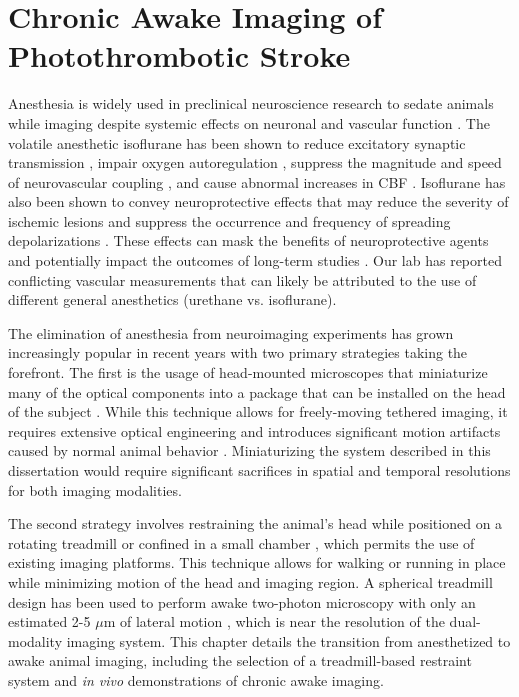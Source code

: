 
\chapter{Chronic Awake Imaging of Photothrombotic Stroke} \label{ch:awake}

Anesthesia is widely used in preclinical neuroscience research to sedate animals while imaging despite systemic effects on neuronal and vascular function \cite{Janssen:2004ih}. The volatile anesthetic isoflurane has been shown to reduce excitatory synaptic transmission \cite{BergJohnsen:1992wk}, impair oxygen autoregulation \cite{Aksenov:2012wh}, suppress the magnitude and speed of neurovascular coupling \cite{Pisauro:2013cx}, and cause abnormal increases in CBF \cite{Strebel:1995uh, Iida:1998th}. Isoflurane has also been shown to convey neuroprotective effects that may reduce the severity of ischemic lesions \cite{Sakai:2007wc, Burchell:2013tj} and suppress the occurrence and frequency of spreading depolarizations \cite{Kudo:2016ho}. These effects can mask the benefits of neuroprotective agents and potentially impact the outcomes of long-term studies \cite{Kapinya:ua, Seto:2014ga}. Our lab has reported \cite{Ponticorvo:2010uv, Kazmi:2013ey, Sullender:2018ff} conflicting vascular  measurements that can likely be attributed to the use of different general anesthetics (urethane vs. isoflurane).

The elimination of anesthesia from neuroimaging experiments has grown increasingly popular in recent years with two primary strategies taking the forefront. The first is the usage of head-mounted microscopes that miniaturize many of the optical components into a package that can be installed on the head of the subject \cite{Gu:1999ky, Helmchen:2001tw, Flusberg:2005tq}. While this technique allows for freely-moving tethered imaging, it requires extensive optical engineering and introduces significant motion artifacts caused by normal animal behavior \cite{Helmchen:2001tw}. Miniaturizing the system described in this dissertation would require significant sacrifices in spatial and temporal resolutions for both imaging modalities.

The second strategy involves restraining the animal's head while positioned on a rotating treadmill \cite{Pisauro:2013cx, Dombeck:2007gr, Wienisch:2011ju, Kaifosh:2013fy, Heiney:2018gq} or confined in a small chamber \cite{Silasi:2016dq}, which permits the use of existing imaging platforms. This technique allows for walking or running in place while minimizing motion of the head and imaging region. A spherical treadmill design has been used to perform awake two-photon microscopy with only an estimated 2-5 $\mu$m of lateral motion \cite{Dombeck:2007gr}, which is near the resolution of the dual-modality imaging system. This chapter details the transition from anesthetized to awake animal imaging, including the selection of a treadmill-based restraint system and \textit{in vivo} demonstrations of chronic awake imaging.



